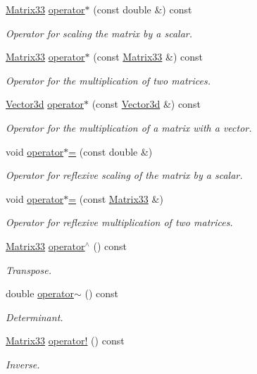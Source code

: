 \begin{DoxyCompactItemize}
\hyperlink{classMatrix33}{Matrix33} \hyperlink{classMatrix33_a6992fd2bb0b6e9ad71b5d3481c4e3e1a}{operator$\ast$} (const double \&) const 
\begin{DoxyCompactList}\small\item\em Operator for scaling the matrix by a scalar. \end{DoxyCompactList}\item 
\hyperlink{classMatrix33}{Matrix33} \hyperlink{classMatrix33_a525f14614255ff81c0cbab8060e8e065}{operator$\ast$} (const \hyperlink{classMatrix33}{Matrix33} \&) const 
\begin{DoxyCompactList}\small\item\em Operator for the multiplication of two matrices. \end{DoxyCompactList}\item 
\hyperlink{classVector3d}{Vector3d} \hyperlink{classMatrix33_a601584a1edbaae7c6a2a2874605d6f61}{operator$\ast$} (const \hyperlink{classVector3d}{Vector3d} \&) const 
\begin{DoxyCompactList}\small\item\em Operator for the multiplication of a matrix with a vector. \end{DoxyCompactList}\item 
void \hyperlink{classMatrix33_a83162791813bef030b1ceb5df3c5cae3}{operator$\ast$=} (const double \&)
\begin{DoxyCompactList}\small\item\em Operator for reflexive scaling of the matrix by a scalar. \end{DoxyCompactList}\item 
void \hyperlink{classMatrix33_ac3937bdeb034cc83b4adcad16cd58a26}{operator$\ast$=} (const \hyperlink{classMatrix33}{Matrix33} \&)
\begin{DoxyCompactList}\small\item\em Operator for reflexive multiplication of two matrices. \end{DoxyCompactList}\item 
\hyperlink{classMatrix33}{Matrix33} \hyperlink{classMatrix33_ad4ab7b9674a44a297502282e1993ef54}{operator$^\wedge$} () const 
\begin{DoxyCompactList}\small\item\em Transpose. \end{DoxyCompactList}\item 
double \hyperlink{classMatrix33_a15b37caa6ab0d9f4a9f0d95846abd675}{operator$\sim$} () const 
\begin{DoxyCompactList}\small\item\em Determinant. \end{DoxyCompactList}\item 
\hyperlink{classMatrix33}{Matrix33} \hyperlink{classMatrix33_a1b822a20343a26b3c9bb7fd5c1247f37}{operator!} () const 
\begin{DoxyCompactList}\small\item\em Inverse. \end{DoxyCompactList}\end{DoxyCompactItemize}
